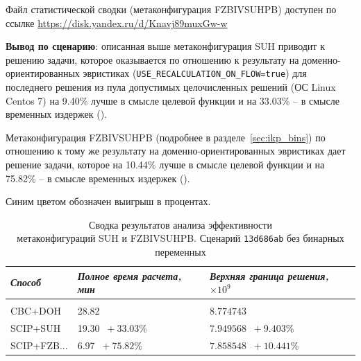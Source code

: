 \documentclass[%
	11pt,
	a4paper,
	utf8,
		]{article}
\begin{document}
Файл статистической сводки (метаконфигурация FZBIVSUHPB) доступен по ссылке \url{https://disk.yandex.ru/d/Knavj89muxGw-w}

\vspace*{3mm}
\textbf{Вывод по сценарию}: описанная выше метаконфигурация SUH приводит к решению задачи, которое оказывается по отношению к результату на доменно-ориентированных эвристиках (\verb|USE_RECALCULATION_ON_FLOW=true|) для последнего решения из пула допустимых целочисленных решений (ОС Linux Centos 7) на 9.40\% лучше в смысле целевой функции и на 33.03\% -- в смысле временных издержек ().

Метаконфигурация FZBIVSUHPB (подробнее в разделе~\ref{sec:ikp_bins}) по отношению к тому же результату на доменно-ориентированных эвристиках дает решение задачи, которое на 10.44\% лучше в смысле целевой функции и на  75.82\% -- в смысле временных издержек ().

Синим цветом обозначен выигрыш в процентах.

{
	\begin{table}[!h]
		\centering
		\caption{Сводка результатов анализа эффективности \\метаконфигураций SUH и FZBIVSUHPB. Сценарий \texttt{13d686ab} без бинарных переменных}
		\begin{tabular}{ p{2.5cm} p{3.3cm} p{3.4cm} }
			\emph{Способ} & \emph{Полное время расчета, мин} & \emph{Верхняя граница решения, $ \times 10^{9} $} \\
			\hline\hline\\[-3.5mm]
			{CBC+DOH} & 28.82 & $ 8.774743 $ \\
			\hline
			SCIP+SUH & 19.30 {\color{blue} $\ +33.03 $\%} & $ 7.949568 $ {\color{blue} $\ +9.403 $\%} \\
			\hline
			SCIP+FZB... & 6.97 {\color{blue} $\ +75.82 $\%} & $ 7.858548 $ {\color{blue} $\ +10.441 $\%} \\
		\end{tabular}\label{tab:13d686ab_wo_bins}
	\end{table}
}
\end{document}
